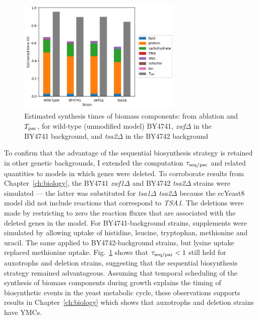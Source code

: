 \begin{figure}
  \centering
  \includegraphics[width=0.7\textwidth]{deletions}

  \caption[
    Estimated synthesis times of biomass components, for BY4741, \textit{zwf$\Delta$}, and \textit{tsa2$\Delta$}
  ]{
    Estimated synthesis times of biomass components: from ablation and $T_{\mathrm{par}}$, for wild-type (unmodified model) BY4741, \textit{zwf$\Delta$} in the BY4741 background, and \textit{tsa2$\Delta$} in the BY4742 background
  }
  \label{fig:model-ablation-strains}
\end{figure}

To confirm that the advantage of the sequential biosynthesis strategy is retained in other genetic backgrounds, I extended the computation $\tau_{\mathrm{seq}/\mathrm{par}}$ and related quantities to models in which genes were deleted.
To corroborate results from Chapter~\ref{ch:biology}, the BY4741 \textit{zwf1$\Delta$} and BY4742 \textit{tsa2$\Delta$} strains were simulated --- the latter was substituted for \textit{tsa1$\Delta$ tsa2$\Delta$} because the ecYeast8 model did not include reactions that correspond to \textit{TSA1}.
The deletions were made by restricting to zero the reaction fluxes that are associated with the deleted genes in the model.
For BY4741-background strains, supplements were simulated by allowing uptake of histidine, leucine, tryptophan, methionine and uracil.
The same applied to BY4742-background strains, but lysine uptake replaced methionine uptake.
Fig.\ \ref{fig:model-ablation-strains} shows that $\tau_{\mathrm{seq}/\mathrm{par}} < 1$ still held for auxotrophs and deletion strains, suggesting that the sequential biosynthesis strategy remained advantageous.
Assuming that temporal scheduling of the synthesis of biomass components during growth explains the timing of biosynthetic events in the yeast metabolic cycle, these observations supports results in Chapter~\ref{ch:biology} which shows that auxotrophs and deletion strains have YMCs.


